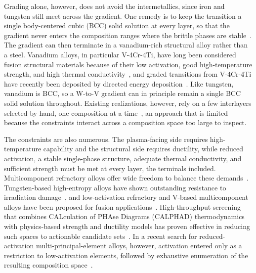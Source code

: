 Grading alone, however, does not avoid the intermetallics, since iron and tungsten
still meet across the gradient. One remedy is to keep the transition a single
body-centered cubic (BCC) solid solution at every layer, so that the gradient never
enters the composition ranges where the brittle phases are
stable~\cite{fgmWsteelInterlayerBCC2023}. The gradient can then terminate in a
vanadium-rich structural alloy rather than a steel. Vanadium alloys, in particular
V-4Cr-4Ti, have long been considered fusion structural materials because of their
low activation, good high-temperature strength, and high thermal
conductivity~\cite{smith1995vanadium,muroga2002vanadium,kurtz2004vanadium}, and
graded transitions from V-4Cr-4Ti have recently been deposited by directed energy
deposition~\cite{ebeperi2025ded}. Like tungsten, vanadium is BCC, so a W-to-V
gradient can in principle remain a single BCC solid solution throughout. Existing
realizations, however, rely on a few interlayers selected by hand, one composition
at a time~\cite{fgmWsteelInterlayerBCC2023}, an approach that is limited because the
constraints interact across a composition space too large to inspect.

The constraints are also numerous. The plasma-facing side requires high-temperature
capability and the structural side requires ductility, while reduced activation, a
stable single-phase structure, adequate thermal conductivity, and sufficient
strength must be met at every layer, the terminals included.
Multicomponent refractory alloys offer wide freedom to balance these
demands~\cite{Senkov2010,senkov2018review}. Tungsten-based high-entropy alloys have
shown outstanding resistance to irradiation
damage~\cite{ElAtwani2019Radiation,elatwani2023quinary}, and low-activation
refractory and V-based multicomponent alloys have been proposed for fusion
applications~\cite{waseem2017powder,kareer2019lowactivation,barron2020vbased,carruthers2021tivcrfe,HEAnuclear2021}.
High-throughput screening that combines CALculation of PHAse Diagrams (CALPHAD)
thermodynamics with physics-based strength and ductility models has proven effective
in reducing such spaces to actionable candidate
sets~\cite{senkov2015accelerated,vela2023highthroughput,vela2023data,HTcalphad2022}.
In a recent search for reduced-activation multi-principal-element alloys, however,
activation entered only as a restriction to low-activation elements, followed by
exhaustive enumeration of the resulting composition space~\cite{harada2025rampea}.

